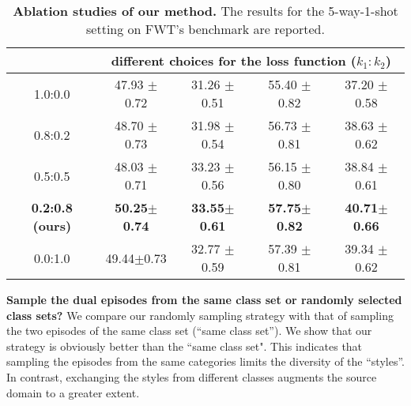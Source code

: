 \documentclass{article}
\newcommand{\mypm}{\scriptsize$\pm$}
\begin{document}
\begin{table*}[h]
\begin{center}
\begin{tabular} {c c c c c}
		
				& \multicolumn{4}{c}{different choices for the loss function ($k_1:k_2$)} \\
				\hline
				1.0:0.0 & 47.93 \mypm0.72 &	31.26 \mypm0.51 &	55.40 \mypm0.82 &	37.20 \mypm0.58 \\
				\hline
				0.8:0.2 & 48.70 \mypm0.73 &	31.98 \mypm0.54 &	56.73 \mypm0.81 &	38.63 \mypm0.62 
				\\
				\hline
				0.5:0.5 & 48.03 \mypm0.71 & 	33.23 \mypm0.56 &	56.15 \mypm0.80 & 	38.84 \mypm0.61 \\
				\hline
				\textbf{0.2:0.8 (ours)} & \textbf{50.25\mypm0.74}  & \textbf{33.55\mypm0.61}& \textbf{57.75\mypm0.82} & \textbf{40.71\mypm0.66} \\
				\hline
				0.0:1.0  & 	49.44\mypm0.73 & 	32.77 \mypm0.59 & 57.39 \mypm0.81 &   39.34 \mypm0.62 \\
				\bottomrule
			\end{tabular}
		\end{center}
		\caption{\textbf{Ablation studies of our method.} The results for the 5-way-1-shot setting on FWT's benchmark are reported. }
\label{tab:abla}
	\end{table*}
	
	
	
	\noindent\textbf{Sample the dual episodes from the same class set or randomly selected class sets?} We compare our randomly sampling strategy with that of sampling the two episodes of the same class set (``same class set''). We show that our strategy is obviously better than the ``same class set". This indicates that sampling the episodes from the same categories limits the diversity of the ``styles''. In contrast, exchanging the styles from different classes augments the source domain to a greater extent.
	
\end{document}
